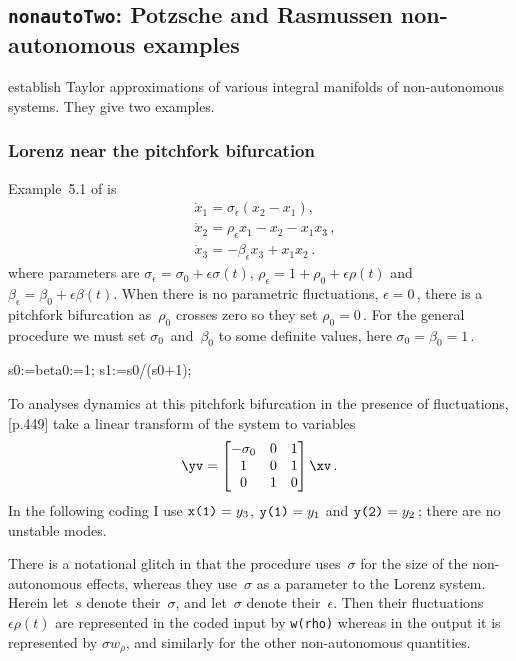 \subsection{\texttt{nonautoTwo}: Potzsche and Rasmussen non-autonomous examples} 
\label{nonautoTwo}


\cite{Potzsche2006} establish Taylor approximations of various integral manifolds of non-autonomous systems.
They give two examples.

\subsubsection{Lorenz near the pitchfork bifurcation}

Example~5.1 of \cite{Potzsche2006} is
\begin{align*}
&\dot x_1=\sigma_\epsilon(x_2-x_1),\\
&\dot x_2=\rho_\epsilon x_1-x_2-x_1x_3\,,\\
&\dot x_3=-\beta_\epsilon x_3+x_1x_2\,.
\end{align*}
where parameters are $\sigma_\epsilon=\sigma_0+\epsilon\sigma(t)$, $\rho_\epsilon=1+\rho_0+\epsilon\rho(t)$ and $\beta_\epsilon=\beta_0+\epsilon\beta(t)$.
When there is no parametric fluctuations, $\epsilon=0$\,, there is a pitchfork bifurcation as~$\rho_0$ crosses zero so they set $\rho_0=0$\,.
For the general procedure we must set $\sigma_0$~and~$\beta_0$ to some definite values, here $\sigma_0=\beta_0=1$\,.
\begin{reduce}
s0:=beta0:=1; 
s1:=s0/(s0+1);
\end{reduce}

To analyses dynamics at this pitchfork bifurcation in the presence of fluctuations, \cite{Potzsche2006} [p.449] take a linear transform of the system to variables
\begin{equation*}
\yv=\begin{bmatrix}
-\sigma_0&0&1 \\ 1&0&1 \\ 0&1&0
\end{bmatrix}\xv\,.
\end{equation*} 
In the following coding I use $\verb|x(1)|=y_3$, $\verb|y(1)|=y_1$ and $\verb|y(2)|=y_2$\,; there are no unstable modes.

There is a notational glitch in that the procedure uses~\(\sigma\) for the size of the non-autonomous effects, whereas they use~\(\sigma\) as a parameter to the Lorenz system.  Herein let~\(s\) denote their~\(\sigma\), and let~\(\sigma\) denote their~\(\epsilon\).
Then their fluctuations $\epsilon\rho(t)$ are represented in the coded input by \verb|w(rho)| whereas in the output it is represented by $\sigma w_\rho$, and similarly for the other non-autonomous quantities.


